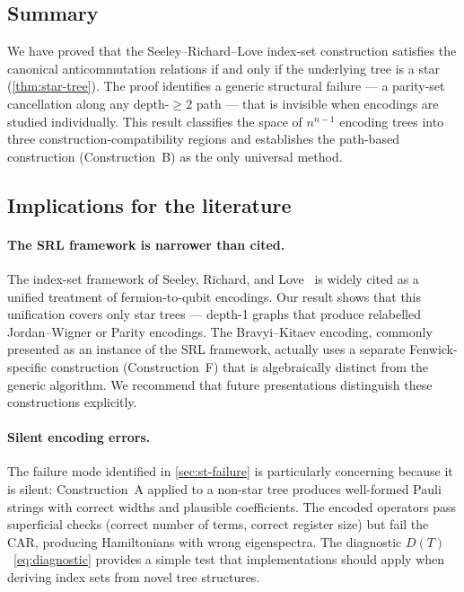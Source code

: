 %

\subsection{Summary}

We have proved that the Seeley--Richard--Love index-set construction
satisfies the canonical anticommutation relations if and only if the
underlying tree is a star (\cref{thm:star-tree}).  The proof
identifies a generic structural failure — a parity-set cancellation
along any depth-$\ge 2$ path — that is invisible when encodings are
studied individually.  This result classifies the space of $n^{n-1}$
encoding trees into three construction-compatibility regions and
establishes the path-based construction (Construction~B) as the only
universal method.

\subsection{Implications for the literature}

\paragraph{The SRL framework is narrower than cited.}
The index-set framework of Seeley, Richard, and
Love~\cite{seeley2012} is widely cited as a unified treatment of
fermion-to-qubit encodings.  Our result shows that this unification
covers only star trees --- depth-1 graphs that produce relabelled
Jordan--Wigner or Parity encodings.  The Bravyi--Kitaev encoding,
commonly presented as an instance of the SRL framework, actually uses
a separate Fenwick-specific construction (Construction~F) that is
algebraically distinct from the generic algorithm.  We recommend that
future presentations distinguish these constructions explicitly.

\paragraph{Silent encoding errors.}
The failure mode identified in \cref{sec:st-failure} is particularly
concerning because it is silent: Construction~A applied to a non-star
tree produces well-formed Pauli strings with correct widths and
plausible coefficients.  The encoded operators pass superficial checks
(correct number of terms, correct register size) but fail the CAR,
producing Hamiltonians with wrong eigenspectra.  The diagnostic
$D(T)$~\eqref{eq:diagnostic} provides a simple test that
implementations should apply when deriving index sets from novel tree
structures.

